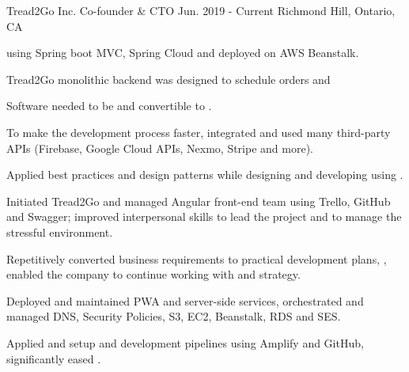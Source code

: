 \begin{cventries}
  \cventry
    {Tread2Go Inc.} %
    {Co-founder \& CTO} %
    {Jun. 2019 - Current} %
    {Richmond Hill, Ontario, CA} %
    {
      \begin{cvitems} %
        \item { using Spring boot MVC, Spring Cloud and deployed on AWS Beanstalk.}
          \begin{cvsubitems}
            \item {Tread2Go monolithic backend was designed to schedule orders and }
            \item {Software needed to be  and convertible to .}
            \item {To make the development process faster, integrated and used many third-party APIs (Firebase, Google Cloud APIs, Nexmo, Stripe and more).}
            \item {Applied best practices and design patterns while designing and developing  using .}
          \end{cvsubitems}
        \item {Initiated Tread2Go  and managed Angular front-end team using Trello, GitHub and Swagger; improved interpersonal skills to lead the project and  to manage the stressful environment.}
          \begin{cvsubitems}
            \item {Repetitively converted business requirements to practical development plans, , enabled the company to continue working with  and  strategy.}
          \end{cvsubitems}
        \item {Deployed and maintained PWA and server-side services, orchestrated and managed DNS, Security Policies, S3, EC2, Beanstalk, RDS and SES.}
          \begin{cvsubitems}
            \item {Applied and setup  and development pipelines using Amplify and GitHub, significantly eased .}
          \end{cvsubitems}
      \end{cvitems}
    }


\end{cventries}
